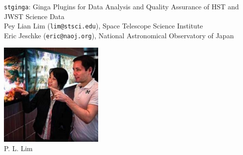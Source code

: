 \documentclass[]{article}
\begin{document}
\begin{minipage}[t]{0.8\linewidth}
  \vspace{0pt}
\begin{center}
{\huge {\tt stginga}: Ginga Plugins for Data Analysis and Quality Assurance of
            HST and JWST Science Data }\\

\vspace*{1.5em}
Pey Lian Lim ({\tt lim@stsci.edu}),
Space Telescope Science Institute \\
Eric Jeschke ({\tt eric@naoj.org}),
National Astronomical Observatory of Japan
\end{center}
\end{minipage}
\hfill
\begin{minipage}[t]{0.15\linewidth}
  \vspace{0pt}
  \includegraphics[width=2in]{pllim} \\
  {P. L. Lim}
\end{minipage}
\vspace*{2em}

\noindent\hrulefill

\raggedcolumns
\setlength{\columnseprule}{1pt}
\setlength{\columnsep}{2em}
\end{document}
